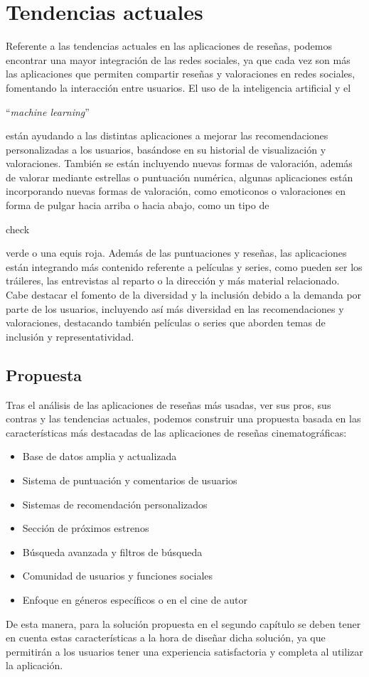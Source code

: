 \section{Tendencias actuales}

Referente a las tendencias actuales en las aplicaciones de reseñas, podemos encontrar una mayor 
integración de las redes sociales, ya que cada vez son más las aplicaciones que permiten compartir 
reseñas y valoraciones en redes sociales, fomentando la interacción entre usuarios. El uso de la 
inteligencia artificial y el \begin{otherlanguage}{english}``\textit{machine 
learning}''\end{otherlanguage} \cite{MachLear} están ayudando a las distintas aplicaciones a mejorar 
las recomendaciones personalizadas a los usuarios, basándose en su historial de visualización y 
valoraciones. También se están incluyendo nuevas formas de valoración, además de valorar mediante 
estrellas o puntuación numérica, algunas aplicaciones están incorporando nuevas formas de valoración, 
como emoticonos o valoraciones en forma de pulgar hacia arriba o hacia abajo, como un tipo de 
\begin{otherlanguage}{english}check \end{otherlanguage} verde o una equis roja. Además de las 
puntuaciones y reseñas, las aplicaciones están integrando más contenido referente a películas y series, 
como pueden ser los tráileres, las entrevistas al reparto o la dirección y más material relacionado. 
Cabe destacar el fomento de la diversidad y la inclusión debido a la demanda por parte de los usuarios, 
incluyendo así más diversidad en las recomendaciones y valoraciones, destacando también películas o 
series que aborden temas de inclusión y representatividad.

\subsection{Propuesta}

Tras el análisis de las aplicaciones de reseñas más usadas, ver sus pros, sus contras y las tendencias 
actuales, podemos construir una propuesta basada en las características más destacadas de las 
aplicaciones de reseñas cinematográficas:

\begin{itemize}
\item Base de datos amplia y actualizada
\item Sistema de puntuación y comentarios de usuarios
\item Sistemas de recomendación personalizados
\item Sección de próximos estrenos
\item Búsqueda avanzada y filtros de búsqueda
\item Comunidad de usuarios y funciones sociales
\item Enfoque en géneros específicos o en el cine de autor
\end{itemize}

De esta manera, para la solución propuesta en el segundo capítulo se deben tener en cuenta estas 
características a la hora de diseñar dicha solución, ya que permitirán a los usuarios tener una 
experiencia satisfactoria y completa al utilizar la aplicación.
